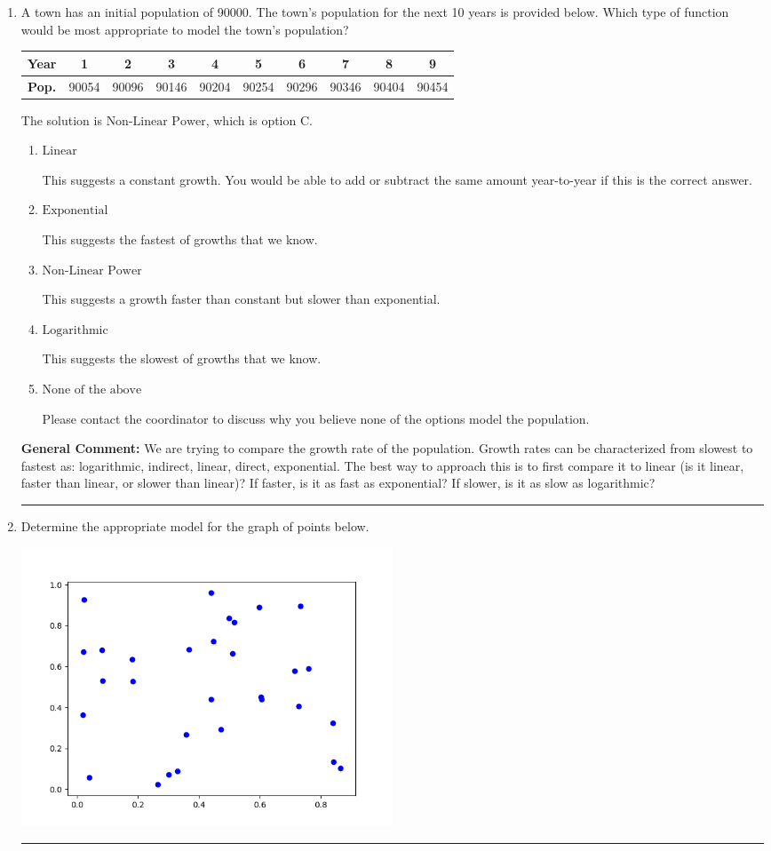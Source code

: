\documentclass{extbook}[14pt]
\newcommand{\litem}[1]{\item #1

\rule{\textwidth}{0.4pt}}
\begin{document}
\begin{enumerate}\litem{
A town has an initial population of 90000. The town's population for the next 10 years is provided below. Which type of function would be most appropriate to model the town's population?



\begin{tabular}{c|c|c|c|c|c|c|c|c|c}
\textbf{Year} & 1 & 2 & 3 & 4 & 5 & 6 & 7 & 8 & 9 \tabularnewline
\hline
\textbf{Pop.} & 90054 & 90096 & 90146 & 90204 & 90254 & 90296 & 90346 & 90404 & 90454
\end{tabular} 

The solution is \( \text{Non-Linear Power} \), which is option C.\begin{enumerate}[label=\Alph*.]
\item \( \text{Linear} \)

This suggests a constant growth. You would be able to add or subtract the same amount year-to-year if this is the correct answer.
\item \( \text{Exponential} \)

This suggests the fastest of growths that we know.
\item \( \text{Non-Linear Power} \)

This suggests a growth faster than constant but slower than exponential.
\item \( \text{Logarithmic} \)

This suggests the slowest of growths that we know.
\item \( \text{None of the above} \)

Please contact the coordinator to discuss why you believe none of the options model the population.
\end{enumerate}

\textbf{General Comment:} We are trying to compare the growth rate of the population. Growth rates can be characterized from slowest to fastest as: logarithmic, indirect, linear, direct, exponential. The best way to approach this is to first compare it to linear (is it linear, faster than linear, or slower than linear)? If faster, is it as fast as exponential? If slower, is it as slow as logarithmic?
}
\litem{
Determine the appropriate model for the graph of points below.

\begin{center}
    \includegraphics[width=0.5\textwidth]{../Figures/identifyModelGraph11CopyB.png}
\end{center}




}
\end{enumerate}
\end{document}
